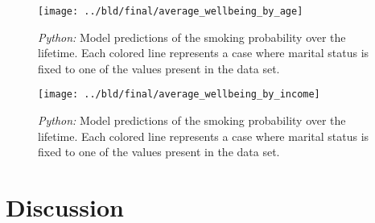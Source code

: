 \documentclass[11pt, a4paper, leqno]{article}
\begin{document}
\begin{figure}[htbp]
    \centering
    \texttt{[image: ../bld/final/average\_wellbeing\_by\_age]}
    \caption{\emph{Python:} Model predictions of the smoking probability over the lifetime. Each colored line represents a case where marital status is fixed to one of the values present in the data set.}
    \label{fig:average_wellbeing_by_age}
\end{figure}

\begin{figure}[htbp]
    \centering
    \texttt{[image: ../bld/final/average\_wellbeing\_by\_income]}
    \caption{\emph{Python:} Model predictions of the smoking probability over the lifetime. Each colored line represents a case where marital status is fixed to one of the values present in the data set.}
    \label{fig:average_wellbeing_by_income}
\end{figure}

\section{Discussion} %
\label{sec:discussion}





\printbibliography
{}



\end{document}
